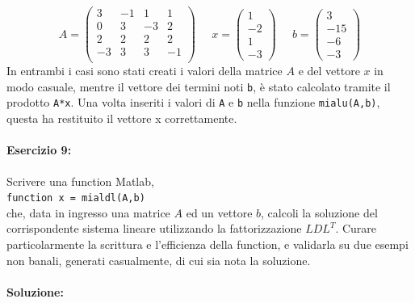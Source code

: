 \documentclass[12pt]{article}
\begin{document}
\begin{equation}
    A=
    \begin{pmatrix}
        3 & -1 & 1 & 1 \\
        0 & 3 & -3 & 2 \\
        2 & 2 & 2 & 2 \\
        -3 & 3 & 3 & -1 \\
    \end{pmatrix}\;\;\;\;\;x=
    \begin{pmatrix}
        1 \\
        -2 \\
        1 \\
        -3 
    \end{pmatrix}\;\;\;\;\;b=
    \begin{pmatrix}
        3 \\
        -15 \\
        -6 \\
        -3 
    \end{pmatrix}
\end{equation}
In entrambi i casi sono stati creati i valori della matrice \(A\) e del vettore \(x\) in modo casuale, mentre il vettore dei termini noti \texttt{b}, è stato calcolato tramite il prodotto
\texttt{A*x}. Una volta inseriti i valori di \texttt{A} e \texttt{b} nella funzione \texttt{mialu(A,b)}, questa ha restituito il vettore x correttamente.
\paragraph{Esercizio 9:}Scrivere una function Matlab,\\
\texttt{function x = mialdl(A,b)}\\
che, data in ingresso una matrice \(A\) ed un vettore \(b\), calcoli la soluzione del corrispondente sistema lineare utilizzando la fattorizzazione \(LDL^{T}\). Curare particolarmente la scrittura e l’efficienza della function, e validarla su due esempi non banali, generati casualmente, 
di cui sia nota la soluzione.
\paragraph{Soluzione:}
\end{document}
